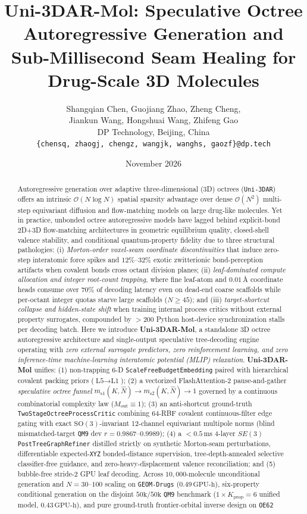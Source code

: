 \documentclass[11pt,a4paper]{article}
\title{\textbf{Uni-3DAR-Mol: Speculative Octree Autoregressive Generation and Sub-Millisecond Seam Healing for Drug-Scale 3D Molecules}}
\author{
Shangqian Chen, Guojiang Zhao, Zheng Cheng,\\
Jiankun Wang, Hongshuai Wang, Zhifeng Gao\\[4pt]
\small DP Technology, Beijing, China\\
\small\texttt{\{chensq, zhaogj, chengz, wangjk, wanghs, gaozf\}@dp.tech}
}
\date{November 2026}
\begin{document}
\maketitle

\begin{abstract}
Autoregressive generation over adaptive three-dimensional (3D) octrees (\texttt{Uni-3DAR}) offers an intrinsic $\mathcal{O}(N \log N)$ spatial sparsity advantage over dense $\mathcal{O}(N^2)$ multi-step equivariant diffusion and flow-matching models on large drug-like molecules. Yet in practice, unbonded octree autoregressive models have lagged behind explicit-bond 2D+3D flow-matching architectures in geometric equilibrium quality, closed-shell valence stability, and conditional quantum-property fidelity due to three structural pathologies: (i) \emph{Morton-order voxel-seam coordinate discontinuities} that induce zero-step interatomic force spikes and $12\%\text{--}32\%$ exotic zwitterionic bond-perception artifacts when covalent bonds cross octant division planes; (ii) \emph{leaf-dominated compute allocation and integer root-count trapping}, where fine leaf-atom and $0.01\,\text{\AA}$ coordinate heads consume over $70\%$ of decoding latency even on dead-end coarse scaffolds while per-octant integer quotas starve large scaffolds ($N \ge 45$); and (iii) \emph{target-shortcut collapse and hidden-state shift} when training internal process critics without external property surrogates, compounded by $>200$ Python host-device synchronization stalls per decoding batch. Here we introduce \textbf{Uni-3DAR-Mol}, a standalone 3D octree autoregressive architecture and single-output speculative tree-decoding engine operating with \emph{zero external surrogate predictors, zero reinforcement learning, and zero inference-time machine-learning interatomic potential (MLIP) relaxation}. \textbf{Uni-3DAR-Mol} unifies: (1) non-trapping 6-D \texttt{ScaleFree\allowbreak Budget\allowbreak Embedding} paired with hierarchical covalent packing priors ($\text{L5}\to\text{L1}$); (2) a vectorized FlashAttention-2 pause-and-gather \emph{speculative octree funnel} $m_{\text{s1}}(K,\hat{N}) \to m_{\text{s2}}(K,\hat{N}) \to 1$ governed by a continuous combinatorial complexity law ($M_{\text{out}} \equiv 1$); (3) an anti-shortcut ground-truth \texttt{TwoStage\allowbreak Octree\allowbreak ProcessCritic} combining $64$-RBF covalent continuous-filter edge gating with exact $\text{SO}(3)$-invariant 12-channel equivariant multipole norms (blind mismatched-target \texttt{QM9} dev $r = 0.9867\text{--}0.9989$); (4) a $<0.5\,\text{ms}$ $4$-layer $SE(3)$ \texttt{PostTree\allowbreak Graph\allowbreak Refiner} distilled strictly on synthetic Morton-seam perturbations, differentiable expected-\texttt{XYZ} bonded-distance supervision, tree-depth-annealed selective classifier-free guidance, and zero-heavy-displacement valence reconciliation; and (5) bubble-free stride-$2$ GPU leaf decoding. Across $10{,}000$-molecule unconditional generation and $N=30\text{--}100$ scaling on \texttt{GEOM-Drugs} ($0.49\,\text{GPU-h}$), six-property conditional generation on the disjoint $50\text{k}/50\text{k}$ \texttt{QM9} benchmark ($1 \times K_{\text{prop}}=6$ unified model, $0.43\,\text{GPU-h}$), and pure ground-truth frontier-orbital inverse design on \texttt{OE62} 
\end{abstract}
\end{document}
